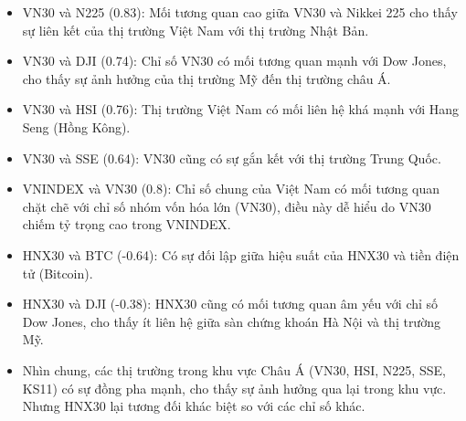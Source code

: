 \begin{itemize}
    \item VN30 và N225 (0.83): Mối tương quan cao giữa VN30 và Nikkei 225 cho thấy sự liên kết của thị trường Việt Nam với thị trường Nhật Bản.
    \item VN30 và DJI (0.74): Chỉ số VN30 có mối tương quan mạnh với Dow Jones, cho thấy sự ảnh hưởng của thị trường Mỹ đến thị trường châu Á. 
    \item VN30 và HSI (0.76): Thị trường Việt Nam có mối liên hệ khá mạnh với Hang Seng (Hồng Kông).
    \item VN30 và SSE (0.64): VN30 cũng có sự gắn kết với thị trường Trung Quốc.
    \item VNINDEX và VN30 (0.8): Chỉ số chung của Việt Nam có mối tương quan chặt chẽ với chỉ số nhóm vốn hóa lớn (VN30), điều này dễ hiểu do VN30 chiếm tỷ trọng cao trong VNINDEX.
    \item HNX30 và BTC (-0.64): Có sự đối lập giữa hiệu suất của HNX30 và tiền điện tử (Bitcoin).
    \item HNX30 và DJI (-0.38): HNX30 cũng có mối tương quan âm yếu với chỉ số Dow Jones, cho thấy ít liên hệ giữa sàn chứng khoán Hà Nội và thị trường Mỹ.
    \item Nhìn chung, các thị trường trong khu vực Châu Á (VN30, HSI, N225, SSE, KS11) có sự đồng pha mạnh, cho thấy sự ảnh hưởng qua lại trong khu vực. Nhưng HNX30 lại tương đối khác biệt so với các chỉ số khác.
 
\end{itemize}